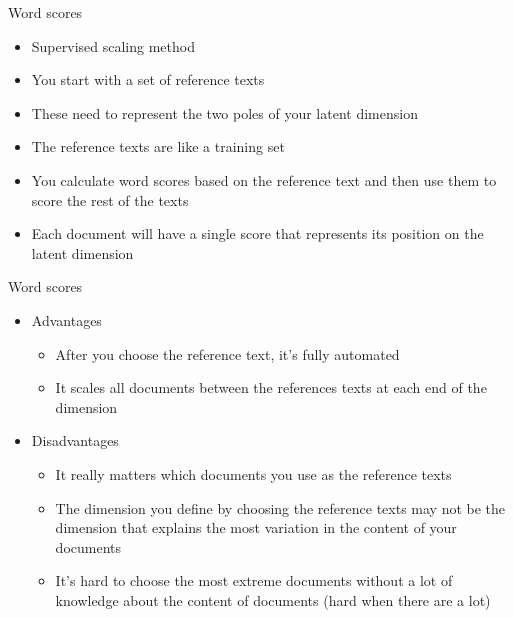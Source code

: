 \documentclass[pdf, 9pt, fleqn, handout]{beamer}
\begin{document}
\begin{frame}{Word scores}
\begin{itemize}
\item Supervised scaling method \\[1em]
\item You start with a set of reference texts \\[1em]
\item These need to represent the two poles of your latent dimension \\[1em]
\item The reference texts are like a training set \\[1em]
\item You calculate word scores based on the reference text and then use them to score the rest of the texts \\[1em]
\item Each document will have a single score that represents its position on the latent dimension
\end{itemize}
\end{frame}

\begin{frame}{Word scores}
\begin{itemize}
\item  Advantages \\[0.5em]
\begin{itemize}
\item After you choose the reference text, it's fully automated \\[1em]
\item It scales all documents between the references texts at each end of the dimension \\[3em]
\end{itemize}
\item Disadvantages \\[0.5em]
\begin{itemize}
\item It really matters which documents you use as the reference texts \\[1em]
\item The dimension you define by choosing the reference texts may not be the dimension that explains the most variation in the content of your documents \\[1em]
\item It's hard to choose the most extreme documents without a lot of knowledge about the content of documents (hard when there are a lot) 
\end{itemize}
\end{itemize}
\end{frame}
\end{document}
